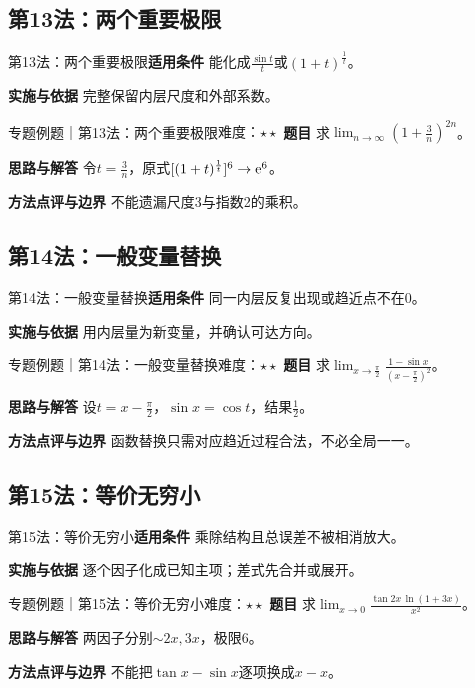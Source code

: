 \subsection{第13法：两个重要极限}\label{mat:limits_35:k13}
\begin{method}{第13法：两个重要极限}\textbf{适用条件} 能化成$\frac{\sin t}{t}$或$(1+t)^{\frac{1}{t}}$。\par\textbf{实施与依据} 完整保留内层尺度和外部系数。\end{method}
\begin{example}{专题例题｜第13法：两个重要极限}{难度：$\star\star$}
\textbf{题目} 求$\lim_{n\to\infty}(1+\frac{3}{n})^{2n}$。\par\textbf{思路与解答} 令$t=\frac{3}{n}$，原式$[(1+t)^{\frac{1}{t}}]^6\to\mathrm{e}^6$。\par\textbf{方法点评与边界} 不能遗漏尺度3与指数2的乘积。
\end{example}
\subsection{第14法：一般变量替换}\label{mat:limits_35:k14}
\begin{method}{第14法：一般变量替换}\textbf{适用条件} 同一内层反复出现或趋近点不在0。\par\textbf{实施与依据} 用内层量为新变量，并确认可达方向。\end{method}
\begin{example}{专题例题｜第14法：一般变量替换}{难度：$\star\star$}
\textbf{题目} 求$\lim_{x\to\frac{\pi}{2}}\frac{1-\sin x}{(x-\frac{\pi}{2})^2}$。\par\textbf{思路与解答} 设$t=x-\frac{\pi}{2}$，$\sin x=\cos t$，结果$\frac{1}{2}$。\par\textbf{方法点评与边界} 函数替换只需对应趋近过程合法，不必全局一一。
\end{example}
\subsection{第15法：等价无穷小}\label{mat:limits_35:k15}
\begin{method}{第15法：等价无穷小}\textbf{适用条件} 乘除结构且总误差不被相消放大。\par\textbf{实施与依据} 逐个因子化成已知主项；差式先合并或展开。\end{method}
\begin{example}{专题例题｜第15法：等价无穷小}{难度：$\star\star$}
\textbf{题目} 求$\lim_{x\to0}\frac{\tan2x\,\ln(1+3x)}{x^2}$。\par\textbf{思路与解答} 两因子分别$\sim2x,3x$，极限6。\par\textbf{方法点评与边界} 不能把$\tan x-\sin x$逐项换成$x-x$。
\end{example}
